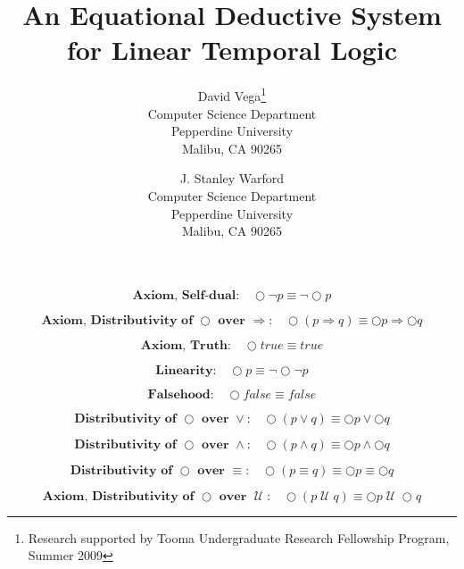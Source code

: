 \documentclass[fleqn, leqno]{article}
\title{An Equational Deductive System\\for Linear Temporal Logic}
\author{David Vega\thanks{Research supported by Tooma Undergraduate Research Fellowship Program, Summer 2009}\\
   Computer Science Department\\
   Pepperdine University\\
   Malibu, CA 90265
   \and
   J. Stanley Warford\\
   Computer Science Department\\
   Pepperdine University\\
   Malibu, CA 90265}
\date{} %
\newcommand{\until}{\;\mathcal{U}\;}
\begin{document}
\maketitle


\begin{equation}\label{E:selfDual}
\textbf{Axiom, Self-dual:}\quad \bigcirc\lnot p \equiv \lnot\bigcirc p
\end{equation}

\begin{equation}\label{E:distNextImp}
\textbf{Axiom, Distributivity of $\bigcirc$ over $\Rightarrow$:}\quad \bigcirc (p \Rightarrow q) \equiv \bigcirc p \Rightarrow \bigcirc q
\end{equation}

\begin{equation}\label{E:nextTruth}
\textbf{Axiom, Truth:}\quad \bigcirc true \equiv true
\end{equation}

\begin{equation}\label{E:linearity}
\textbf{Linearity:}\quad \bigcirc p \equiv \lnot\bigcirc\lnot p
\end{equation}

\begin{equation}\label{E:nextFalse}
\textbf{Falsehood:}\quad \bigcirc false \equiv false
\end{equation}

\begin{equation}\label{E:distNextOr}
\textbf{Distributivity of $\bigcirc$ over $\lor$:}\quad \bigcirc (p \lor q) \equiv \bigcirc p \lor \bigcirc q
\end{equation}

\begin{equation}\label{E:distNextAnd}
\textbf{Distributivity of $\bigcirc$ over $\land$:}\quad \bigcirc (p \land q) \equiv \bigcirc p \land \bigcirc q
\end{equation}

\begin{equation}\label{E:distNextEquiv}
\textbf{Distributivity of $\bigcirc$ over $\equiv$:}\quad \bigcirc (p \equiv q) \equiv \bigcirc p \equiv \bigcirc q
\end{equation}

\begin{equation}\label{E:distNextUntil}
\textbf{Axiom, Distributivity of $\bigcirc$ over $\until$:}\quad \bigcirc (p \until q) \equiv \bigcirc p \until \bigcirc q
\end{equation}
\end{document}
